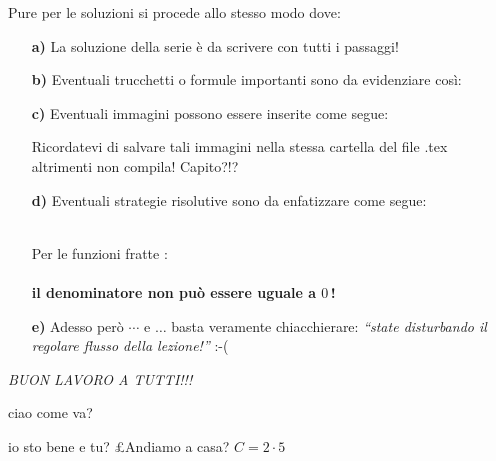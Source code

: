 \documentclass[a4paper,10pt]{article}
\newcommand{\hili}[1]{\colorbox{yellow}{#1}}
\begin{document}
Pure per le soluzioni si procede allo stesso modo dove:
\begin{itemize}
\item[\textbf{a)}] La soluzione della serie \`e da scrivere con tutti i passaggi!
\item[\textbf{b)}] Eventuali trucchetti o formule importanti sono da evidenziare cos\`i:\\
\boxed{\hili{$E=mc^2$}}
\item[\textbf{c)}] Eventuali immagini possono essere inserite come segue:
\begin{center}
\end{center}
Ricordatevi di salvare tali immagini nella stessa cartella del file .tex altrimenti non compila! Capito?!?
\item[\textbf{d)}] Eventuali strategie risolutive sono da enfatizzare come segue:\\\\
\begin{minipage}{3cm}
\begin{center}
\end{center}
\end{minipage}
\hfill
\begin{minipage}{12.5cm}
Per le funzioni fratte :\\\\ \textbf{il denominatore non pu\`o essere uguale a $0$\,!}
\end{minipage} 
\item[\textbf{e)}] Adesso per\`o $\cdots$ e $\ldots$ basta veramente chiacchierare: \textit{``state disturbando il regolare flusso della lezione!''} :-(
\end{itemize}



\begin{center}
\emph{BUON LAVORO A TUTTI!!!}
\end{center}

ciao come va?

io sto bene e tu? £Andiamo a casa?
$C=2\cdot5$
\end{document}
